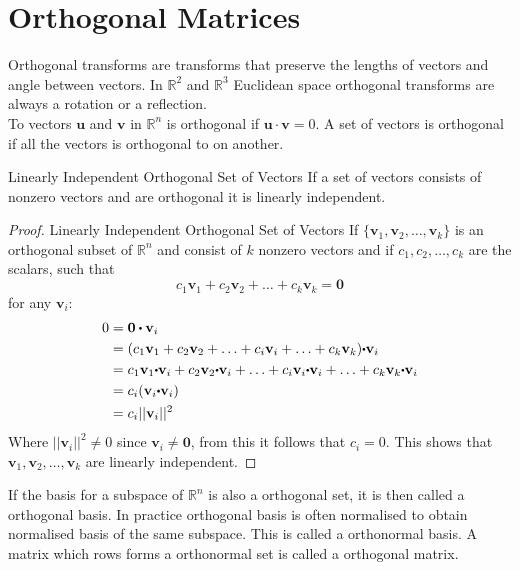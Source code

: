 \section{Orthogonal Matrices}
Orthogonal transforms are transforms that preserve the lengths of vectors and angle between vectors. In $\mathbb{R}^2$ and $\mathbb{R}^3$ Euclidean space orthogonal transforms are always a rotation or a reflection. \\
To vectors $\textbf{u}$ and $\textbf{v}$ in $\mathbb{R}^n$ is orthogonal if $\textbf{u}\cdot \textbf{v}=0$. A set of vectors is orthogonal if all the vectors is orthogonal to on another. 
\begin{theorem}{Linearly Independent Orthogonal Set of Vectors}
If a set of vectors consists of nonzero vectors and are orthogonal it is linearly independent.\cite[375]{LiAl}
\end{theorem}

\begin{proof}{Linearly Independent Orthogonal Set of Vectors}
If $\{\mathbf{v}_1, \mathbf{v}_2, \hdots, \mathbf{v}_k\}$ is an orthogonal subset of $\mathbb{R}^n$ and consist of $k$ nonzero vectors and if $c_1, c_2, \hdots, c_k$ are the scalars, such that
$$c_1\mathbf{v}_1 + c_2\mathbf{v}_2 + \hdots + c_k\mathbf{v}_k = \textbf{0}$$
for any $\mathbf{v}_i$:
\begin{align*}
  0 &= \mathbf{0 \vprik v}_i  \\
  &= (c_1\mathbf{v}_1 + c_2\mathbf{v}_2 + \hdots + c_i \mathbf{v}_i + \hdots + c_k \mathbf{v}_k ) \mathbf{\vprik v}_i \\
  &= c_1\mathbf{v}_1 \mathbf{\vprik v}_i + c_2\mathbf{v}_2 \mathbf{\vprik v}_i + \hdots + c_i \mathbf{v}_i \mathbf{\vprik v}_i + \hdots + c_k\mathbf{v}_k \mathbf{\vprik v}_i \\
  &=c_i(\mathbf{v}_i \mathbf{\vprik v}_i)\\
  &=c_i||\mathbf{v}_i||^2
\end{align*}
Where $||\mathbf{v}_i||^2 \neq 0$ since $\mathbf{v}_i \neq \mathbf{0}$, from this it follows that $c_i=0$. This shows that $\mathbf{v}_1, \mathbf{v}_2, \hdots, \mathbf{v}_k$ are linearly independent. \qedsymbol   
\end{proof}
If the basis for a subspace of $\mathbb{R}^n$ is also a orthogonal set, it is then called a orthogonal basis. In practice orthogonal basis is often normalised to obtain normalised basis of the same subspace. This is called a orthonormal basis.  A matrix which rows forms a orthonormal set is called a orthogonal matrix.

